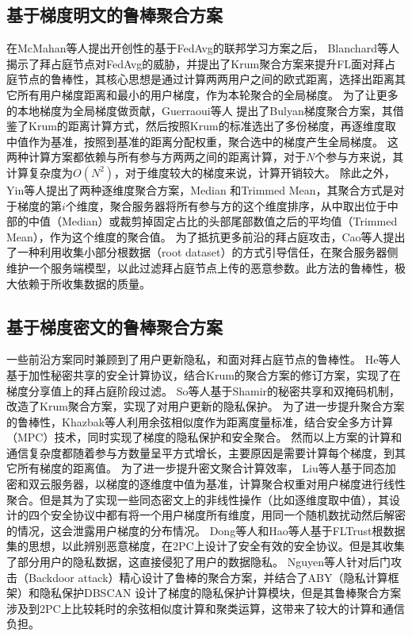 \subsection{基于梯度明文的鲁棒聚合方案}
在McMahan等人\cite{mcmahan2017communication}提出开创性的基于FedAvg的联邦学习方案之后，
Blanchard等人\cite{blanchard2017machine}揭示了拜占庭节点对FedAvg的威胁，并提出了Krum聚合方案来提升FL面对拜占庭节点的鲁棒性，其核心思想是通过计算两两用户之间的欧式距离，选择出距离其它所有用户梯度距离和最小的用户梯度，作为本轮聚合的全局梯度。
为了让更多的本地梯度为全局梯度做贡献，Guerraoui等人 \cite{guerraoui2018hidden}提出了Bulyan梯度聚合方案，其借鉴了Krum的距离计算方式，然后按照Krum的标准选出了多份梯度，再逐维度取中值作为基准，按照到基准的距离分配权重，聚合选中的梯度产生全局梯度。
这两种计算方案都依赖与所有参与方两两之间的距离计算，对于$N$个参与方来说，其计算复杂度为$O(N^2)$，对于维度较大的梯度来说，计算开销较大。
除此之外，Yin等人\cite{yin2018byzantine}提出了两种逐维度聚合方案，Median 和Trimmed Mean，其聚合方式是对于梯度的第$i$个维度，聚合服务器将所有参与方的这个维度排序，从中取出位于中部的中值（Median）或裁剪掉固定占比的头部尾部数值之后的平均值（Trimmed Mean），作为这个维度的聚合值。
为了抵抗更多前沿的拜占庭攻击，Cao等人\cite{DBLP:conf/ndss/CaoF0G21}提出了一种利用收集小部分根数据（root dataset）的方式引导信任，在聚合服务器侧维护一个服务端模型，以此过滤拜占庭节点上传的恶意参数。此方法的鲁棒性，极大依赖于所收集数据的质量。

\subsection{基于梯度密文的鲁棒聚合方案}
一些前沿方案同时兼顾到了用户更新隐私，和面对拜占庭节点的鲁棒性。
He等人基于加性秘密共享的安全计算协议，结合Krum的聚合方案的修订方案，实现了在梯度分享值上的拜占庭阶段过滤。
So等人基于Shamir的秘密共享和双掩码机制，改造了Krum聚合方案，实现了对用户更新的隐私保护。
为了进一步提升聚合方案的鲁棒性，Khazbak等人\cite{khazbak2020mlguard}利用余弦相似度作为距离度量标准，结合安全多方计算（MPC）技术，同时实现了梯度的隐私保护和安全聚合。
然而以上方案的计算和通信复杂度都随着参与方数量呈平方式增长，主要原因是需要计算每个梯度，到其它所有梯度的距离值。
为了进一步提升密文聚合计算效率，
Liu等人\cite{liu2021privacy}基于同态加密和双云服务器，以梯度的逐维度中值为基准，计算聚合权重对用户梯度进行线性聚合。但是其为了实现一些同态密文上的非线性操作（比如逐维度取中值），其设计的四个安全协议中都有将一个用户梯度所有维度，用同一个随机数扰动然后解密的情况，这会泄露用户梯度的分布情况。
Dong等人\cite{dong2021flod}和Hao等人\cite{hao2021efficient}基于FLTrust\cite{DBLP:conf/ndss/CaoF0G21}根数据集的思想，以此辨别恶意梯度，在2PC上设计了安全有效的安全协议。但是其收集了部分用户的隐私数据，这直接侵犯了用户的数据隐私。
Nguyen等人\cite{nguyen2022flame}针对后门攻击（Backdoor attack）精心设计了鲁棒的聚合方案，并结合了ABY\cite{demmler2015aby}（隐私计算框架）和隐私保护DBSCAN \cite{bozdemir2021privacy}设计了梯度的隐私保护计算模块，但是其鲁棒聚合方案涉及到2PC上比较耗时的余弦相似度计算和聚类运算，这带来了较大的计算和通信负担。

